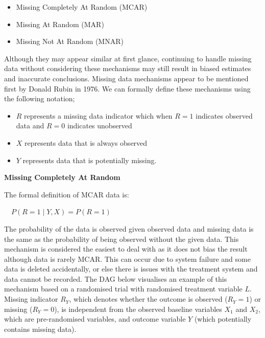 \documentclass{article}
\providecommand{\tightlist}{%
  \setlength{\itemsep}{0pt}\setlength{\parskip}{0pt}}
\begin{document}
\begin{itemize}
\tightlist
\item
  Missing Completely At Random (MCAR)
\item
  Missing At Random (MAR)
\item
  Missing Not At Random (MNAR)
\end{itemize}

Although they may appear similar at first glance, continuing to handle
missing data without considering these mechanisms may still result in
biased estimates and inaccurate conclusions. Missing data mechanisms
appear to be mentioned first by Donald Rubin in 1976. We can formally
define these mechanisms using the following notation;

\begin{itemize}
\tightlist
\item
  \(R\) represents a missing data indicator which when \(R=1\) indicates
  observed data and \(R=0\) indicates unobserved
\item
  \(X\) represents data that is always observed
\item
  \(Y\) represents data that is potentially missing.
\end{itemize}

\textbf{Missing Completely At Random}

The formal definition of MCAR data is:

\(\quad P(R = 1 \mid Y, X) = P(R = 1)\)

The probability of the data is observed given observed data and missing
data is the same as the probability of being observed without the given
data. This mechanism is considered the easiest to deal with as it does
not bias the result although data is rarely MCAR. This can occur due to
system failure and some data is deleted accidentally, or else there is
issues with the treatment system and data cannot be recorded. The DAG
below visualises an example of this mechanism based on a randomised
trial with randomised treatment variable \(L\). Missing indicator
\(R_Y\), which denotes whether the outcome is observed (\(R_Y = 1\)) or
missing (\(R_Y = 0\)), is independent from the observed baseline
variables \(X_1\) and \(X_2\), which are pre-randomised variables, and
outcome variable \(Y\) (which potentially contains missing data).
\end{document}
